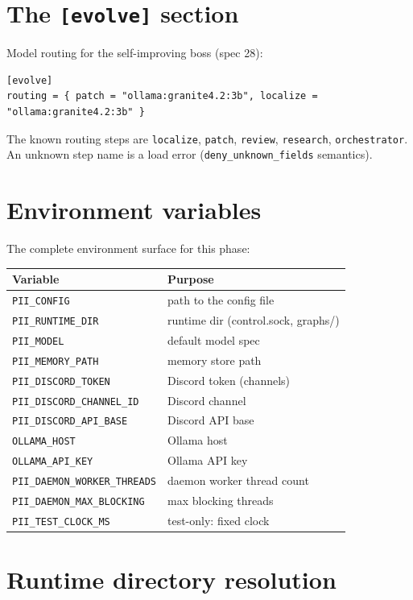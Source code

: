 \documentclass[
	fontsize=10pt,
	twoside=false,
	secnumdepth=2,
	open=any,
]{kaobook}
\begin{document}
\section{The \texttt{[evolve]} section}

Model routing for the self-improving boss (spec 28):

\begin{lstlisting}
[evolve]
routing = { patch = "ollama:granite4.2:3b", localize = "ollama:granite4.2:3b" }
\end{lstlisting}

The known routing steps are \texttt{localize}, \texttt{patch},
\texttt{review}, \texttt{research}, \texttt{orchestrator}. An unknown step
name is a load error (\texttt{deny\_unknown\_fields} semantics).

\section{Environment variables}

The complete environment surface for this phase:

\begin{longtable}{@{}ll@{}}
\toprule
\textbf{Variable} & \textbf{Purpose} \\
\midrule
\endhead
\texttt{PII\_CONFIG} & path to the config file \\
\texttt{PII\_RUNTIME\_DIR} & runtime dir (control.sock, graphs/) \\
\texttt{PII\_MODEL} & default model spec \\
\texttt{PII\_MEMORY\_PATH} & memory store path \\
\texttt{PII\_DISCORD\_TOKEN} & Discord token (channels) \\
\texttt{PII\_DISCORD\_CHANNEL\_ID} & Discord channel \\
\texttt{PII\_DISCORD\_API\_BASE} & Discord API base \\
\texttt{OLLAMA\_HOST} & Ollama host \\
\texttt{OLLAMA\_API\_KEY} & Ollama API key \\
\texttt{PII\_DAEMON\_WORKER\_THREADS} & daemon worker thread count \\
\texttt{PII\_DAEMON\_MAX\_BLOCKING} & max blocking threads \\
\texttt{PII\_TEST\_CLOCK\_MS} & test-only: fixed clock \\
\bottomrule
\end{longtable}

\section{Runtime directory resolution}
\end{document}
